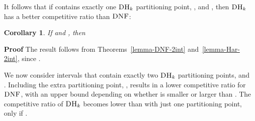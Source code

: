 \documentclass[11pt]{article}
\newtheorem{xcorollary}{Corollary}
\newenvironment{corollary}{\begin{xcorollary}\rm}{\end{xcorollary}}
\newenvironment{proof}{\begin{trivlist}\item[]{\bf Proof }}{\hspace*{\fill}\raisebox{-1pt}{\boldmath}\end{trivlist}}
\newcommand{\DNF}{\ensuremath{\operatorname{\textsc{DNF}}}\xspace}
\newcommand{\DHk}{{\ensuremath{\textsc{DH}_k}}\xspace}
\begin{document}
It follows that if  contains exactly one \DHk partitioning
point, , and , then \DHk has a better competitive ratio than \DNF:

\begin{corollary}
\label{corollary-2int}
 If  and , then 
\end{corollary}
\begin{proof}
 The result follows from Theorems~\ref{lemma-DNF-2int} and~\ref{lemma-Har-2int},
since .
\end{proof}

We now consider intervals  that contain exactly two \DHk partitioning points,
  and .
Including the extra partitioning point, , results in a
 lower competitive ratio for \DNF, with an upper bound depending on whether
  is smaller or larger than .
The competitive ratio of \DHk becomes lower than with just one
partitioning point, only if .
\end{document}
